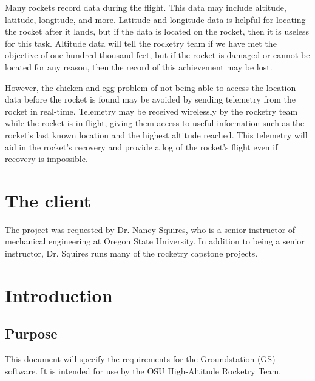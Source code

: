 \documentclass[10pt,draftclsnofoot,onecolumn]{IEEEtran}
\begin{document}
	Many rockets record data during the flight. This data may include
	altitude, latitude, longitude, and more.
	Latitude and longitude
	data is helpful for locating the rocket after it lands, but
	if the data is located on the rocket, then it is useless
	for this task.
	Altitude data will tell the rocketry team if we have
	met the objective of one hundred thousand feet, but if the rocket
	is damaged or cannot be located for any reason, then the record
	of this achievement may be lost.

	However, the chicken-and-egg problem of not being able to access
	the location data before the rocket is found may be avoided by sending
	telemetry from the rocket in real-time.
	Telemetry may be received wirelessly
	by the rocketry team while the rocket is in flight, giving them
	access to useful information such as the rocket's last known location
	and the highest altitude reached. This telemetry will aid in the
	rocket's recovery and provide a log of the rocket's flight even if
	recovery is impossible.




	\section{The client}
	The project was requested by Dr. Nancy Squires, who is a senior
	instructor of mechanical engineering at Oregon State University.
	In addition to being a senior instructor, Dr. Squires runs many
	of the rocketry capstone projects.











	\section{Introduction}

	\subsection{Purpose}
	This document will specify the requirements for the Groundstation (GS) software.
	It is intended for use by the OSU High-Altitude Rocketry Team.

\end{document}
